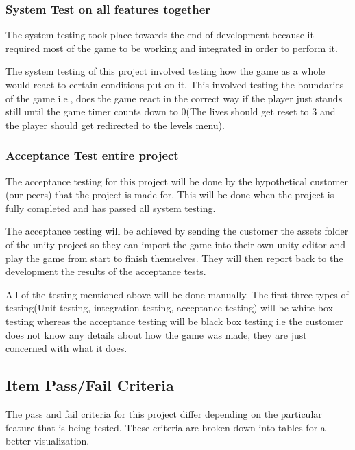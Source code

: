 \documentclass{article}
\begin{document}
\subsubsection{System Test on all features together}
The system testing took place towards the end of development because it required most of the game to be working and integrated in order to perform it. 
\bigskip

The system testing of this project involved testing how the game as a whole would react to certain conditions put on it. This involved testing the boundaries of the game i.e., does the game react in the correct way if the player just stands still until the game timer counts down to 0(The lives should get reset to 3 and the player should get redirected to the levels menu).

\subsubsection{Acceptance Test entire project}
The acceptance testing for this project will be done by the hypothetical customer (our peers) that the project is made for. This will be done when the project is fully completed and has passed all system testing.
\bigskip

The acceptance testing will be achieved by sending the customer the assets folder of the unity project so they can import the game into their own unity editor and play the game from start to finish themselves. They will then report back to the development the results of the acceptance tests.

\bigskip

All of the testing mentioned above will be done manually. The first three types of testing(Unit testing, integration testing, acceptance testing) will be white box testing whereas the acceptance testing will be black box testing i.e the customer does not know any details about how the game was made, they are just concerned with what it does.


\subsection{Item Pass/Fail Criteria}
The pass and fail criteria for this project differ depending on the particular feature that is being tested. These criteria are broken down into tables for a better visualization.
\end{document}
